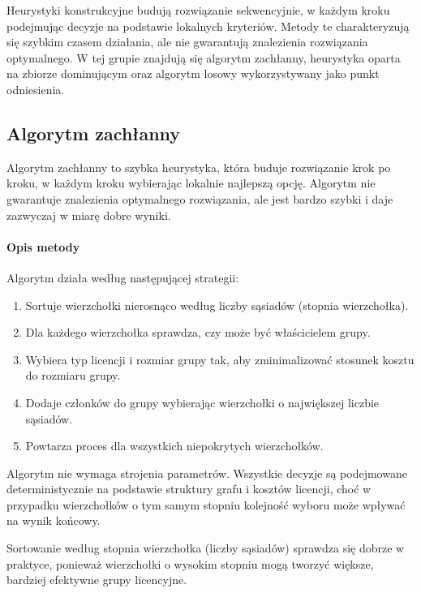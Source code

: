 Heurystyki konstrukcyjne budują rozwiązanie sekwencyjnie, w każdym kroku podejmując decyzje na podstawie lokalnych kryteriów. Metody te charakteryzują się szybkim czasem działania, ale nie gwarantują znalezienia rozwiązania optymalnego. W tej grupie znajdują się algorytm zachłanny, heurystyka oparta na zbiorze dominującym oraz algorytm losowy wykorzystywany jako punkt odniesienia.

\subsection{Algorytm zachłanny}\label{subsec:greedy}

Algorytm zachłanny to szybka heurystyka, która buduje rozwiązanie krok po kroku, w każdym kroku wybierając lokalnie najlepszą opcję. Algorytm nie gwarantuje znalezienia optymalnego rozwiązania, ale jest bardzo szybki i daje zazwyczaj w miarę dobre wyniki.

\paragraph{Opis metody}
Algorytm działa według następującej strategii:
\begin{enumerate}
  \item Sortuje wierzchołki nierosnąco według liczby sąsiadów (stopnia wierzchołka).
  \item Dla każdego wierzchołka sprawdza, czy może być właścicielem grupy.
  \item Wybiera typ licencji i rozmiar grupy tak, aby zminimalizować stosunek kosztu do rozmiaru grupy.
  \item Dodaje członków do grupy wybierając wierzchołki o największej liczbie sąsiadów.
  \item Powtarza proces dla wszystkich niepokrytych wierzchołków.
\end{enumerate}

Algorytm nie wymaga strojenia parametrów. Wszystkie decyzje są podejmowane deterministycznie na podstawie struktury grafu i kosztów licencji, choć w przypadku wierzchołków o tym samym stopniu kolejność wyboru może wpływać na wynik końcowy.

Sortowanie według stopnia wierzchołka (liczby sąsiadów) sprawdza się dobrze w praktyce, ponieważ wierzchołki o wysokim stopniu mogą tworzyć większe, bardziej efektywne grupy licencyjne.

